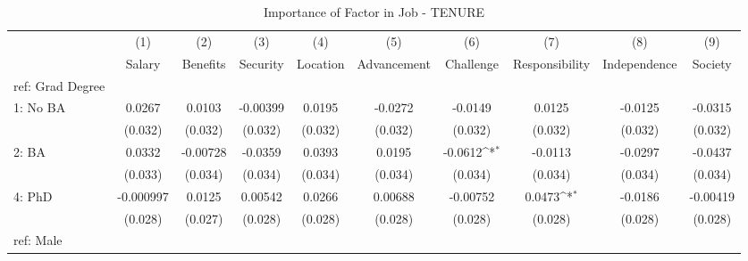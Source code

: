 \begin{table}[htbp]\centering
\def\sym#1{\ifmmode^{#1}\else\(^{#1}\)\fi}
\caption{Importance of Factor in Job - TENURE \label{tab1}}
\begin{tabular}{l*{9}{c}}
\hline\hline
  &\multicolumn{1}{c}{(1)}&\multicolumn{1}{c}{(2)}&\multicolumn{1}{c}{(3)}&\multicolumn{1}{c}{(4)}&\multicolumn{1}{c}{(5)}&\multicolumn{1}{c}{(6)}&\multicolumn{1}{c}{(7)}&\multicolumn{1}{c}{(8)}&\multicolumn{1}{c}{(9)}\\
  &\multicolumn{1}{c}{Salary}&\multicolumn{1}{c}{Benefits}&\multicolumn{1}{c}{Security}&\multicolumn{1}{c}{Location}&\multicolumn{1}{c}{Advancement}&\multicolumn{1}{c}{Challenge}&\multicolumn{1}{c}{Responsibility}&\multicolumn{1}{c}{Independence}&\multicolumn{1}{c}{Society}\\
\hline
ref: Grad Degree&                     &                     &                     &                     &                     &                     &                     &                     &                     \\
[1em]
1: No BA&      0.0267         &      0.0103         &    -0.00399         &      0.0195         &     -0.0272         &     -0.0149         &      0.0125         &     -0.0125         &     -0.0315         \\
  &     (0.032)         &     (0.032)         &     (0.032)         &     (0.032)         &     (0.032)         &     (0.032)         &     (0.032)         &     (0.032)         &     (0.032)         \\
[1em]
2: BA&      0.0332         &    -0.00728         &     -0.0359         &      0.0393         &      0.0195         &     -0.0612\sym{*}  &     -0.0113         &     -0.0297         &     -0.0437         \\
  &     (0.033)         &     (0.034)         &     (0.034)         &     (0.034)         &     (0.034)         &     (0.034)         &     (0.034)         &     (0.034)         &     (0.034)         \\
[1em]
4: PhD&   -0.000997         &      0.0125         &     0.00542         &      0.0266         &     0.00688         &    -0.00752         &      0.0473\sym{*}  &     -0.0186         &    -0.00419         \\
  &     (0.028)         &     (0.027)         &     (0.028)         &     (0.028)         &     (0.028)         &     (0.028)         &     (0.028)         &     (0.028)         &     (0.028)         \\
[1em]
ref: Male&                     &                     &                     &                     &                     &                     &                     &                     &                     \\

\end{tabular}
\end{table}
